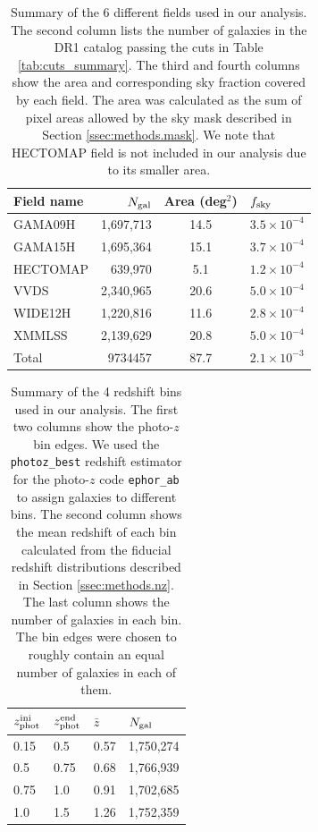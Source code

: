 \documentclass[a4paper,11pt]{article}
\begin{document}
  \begin{table}
  \centering
  \begin{tabular}{|l|r|c|l|}
   \hline
   {\bf Field name} & $N_{\rm gal}$ & {\bf Area} (deg$^2$) & $f_{\rm sky}$ \\
   \hline
   GAMA09H  & 1,697,713 & 14.5 & $3.5\times10^{-4}$ \\
   GAMA15H  & 1,695,364 & 15.1 & $3.7\times10^{-4}$ \\
   HECTOMAP &   639,970 &  5.1 & $1.2\times10^{-4}$ \\
   VVDS     & 2,340,965 & 20.6 & $5.0\times10^{-4}$ \\
   WIDE12H  & 1,220,816 & 11.6 & $2.8\times10^{-4}$ \\
   XMMLSS   & 2,139,629 & 20.8 & $5.0\times10^{-4}$ \\
   \hline
   Total    & 9734457 & 87.7 & $2.1\times10^{-3}$ \\
   \hline
  \end{tabular}
  \caption{Summary of the 6 different fields used in our analysis. The second column lists the number of galaxies in the DR1 catalog passing the cuts in Table \ref{tab:cuts_summary}. The third and fourth columns show the area and corresponding sky fraction covered by each field. The area was calculated as the sum of pixel areas allowed by the sky mask described in Section \ref{ssec:methods.mask}. We note that HECTOMAP field is not included in our analysis due to its smaller area.} \label{tab:field_summary}
  \end{table}  

  \begin{table}
  \centering
  \begin{tabular}{|l|l|l|l|}
    \hline
    $z_{\rm phot}^{\rm ini}$ & $z_{\rm phot}^{\rm end}$ & $\bar{z}$ & $N_{\rm gal}$ \\
    \hline
    0.15 & 0.5  & 0.57 & 1,750,274 \\
    0.5  & 0.75 & 0.68 & 1,766,939 \\
    0.75 & 1.0  & 0.91 & 1,702,685 \\
    1.0  & 1.5  & 1.26 & 1,752,359 \\
    \hline
  \end{tabular}
  \caption{Summary of the 4 redshift bins used in our analysis. The first two columns show the photo-$z$ bin edges. We used the {\tt photoz\_best} redshift estimator for the photo-$z$ code {\tt ephor\_ab} to assign galaxies to different bins. The second column shows the mean redshift of each bin calculated from the fiducial redshift distributions described in Section \ref{ssec:methods.nz}. The last column shows the number of galaxies in each bin. The bin edges were chosen to roughly contain an equal number of galaxies in each of them.} \label{tab:bins_summary}
  \end{table}
  
\end{document}
